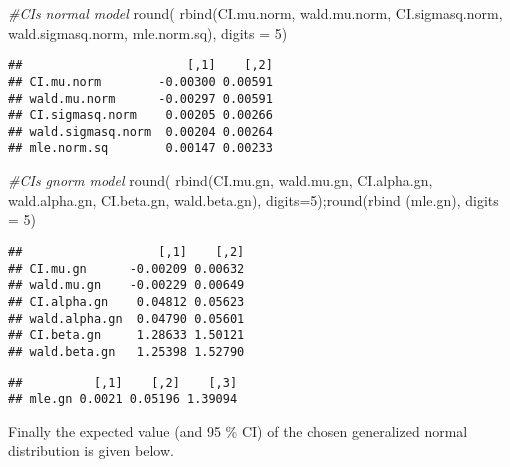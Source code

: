 \documentclass[
]{article}
\newenvironment{Shaded}{\begin{snugshade}}{\end{snugshade}}
\newcommand{\AttributeTok}[1]{\textcolor[rgb]{0.77,0.63,0.00}{#1}}
\newcommand{\CommentTok}[1]{\textcolor[rgb]{0.56,0.35,0.01}{\textit{#1}}}
\newcommand{\DecValTok}[1]{\textcolor[rgb]{0.00,0.00,0.81}{#1}}
\newcommand{\FunctionTok}[1]{\textcolor[rgb]{0.00,0.00,0.00}{#1}}
\newcommand{\NormalTok}[1]{#1}
\begin{document}
\begin{Shaded}
\begin{Highlighting}[]
\CommentTok{\#CIs normal model}
\FunctionTok{round}\NormalTok{( }\FunctionTok{rbind}\NormalTok{(CI.mu.norm, wald.mu.norm, CI.sigmasq.norm, wald.sigmasq.norm, mle.norm.sq), }\AttributeTok{digits =} \DecValTok{5}\NormalTok{)}
\end{Highlighting}
\end{Shaded}

\begin{verbatim}
##                       [,1]    [,2]
## CI.mu.norm        -0.00300 0.00591
## wald.mu.norm      -0.00297 0.00591
## CI.sigmasq.norm    0.00205 0.00266
## wald.sigmasq.norm  0.00204 0.00264
## mle.norm.sq        0.00147 0.00233
\end{verbatim}

\begin{Shaded}
\begin{Highlighting}[]
\CommentTok{\#CIs gnorm model}
\FunctionTok{round}\NormalTok{( }\FunctionTok{rbind}\NormalTok{(CI.mu.gn, wald.mu.gn, CI.alpha.gn, wald.alpha.gn, CI.beta.gn, wald.beta.gn), }\AttributeTok{digits=}\DecValTok{5}\NormalTok{);}\FunctionTok{round}\NormalTok{(}\FunctionTok{rbind}\NormalTok{ (mle.gn), }\AttributeTok{digits =} \DecValTok{5}\NormalTok{)}
\end{Highlighting}
\end{Shaded}

\begin{verbatim}
##                   [,1]    [,2]
## CI.mu.gn      -0.00209 0.00632
## wald.mu.gn    -0.00229 0.00649
## CI.alpha.gn    0.04812 0.05623
## wald.alpha.gn  0.04790 0.05601
## CI.beta.gn     1.28633 1.50121
## wald.beta.gn   1.25398 1.52790
\end{verbatim}

\begin{verbatim}
##          [,1]    [,2]    [,3]
## mle.gn 0.0021 0.05196 1.39094
\end{verbatim}

Finally the expected value (and 95 \% CI) of the chosen generalized
normal distribution is given below.
\end{document}
